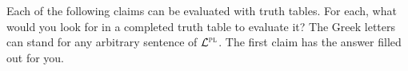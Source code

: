 





\iffalse

\practiceproblems



\problempart
\label{HW3.C}
Each of the following claims can be evaluated with truth tables. For each, what would you look for in a completed truth table to evaluate it? The Greek letters can stand for any arbitrary sentence of $\mathcal{L}^{\textsc{pl}}$. The first claim has the answer filled out for you.

